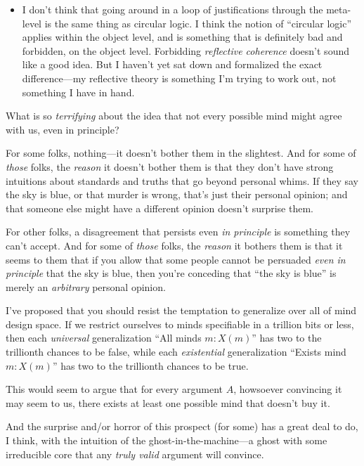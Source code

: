 \begin{itemize}
\item {
 I don't think that going around in a loop of
justifications through the meta-level is the same thing as circular
logic. I think the notion of ``circular
logic'' applies within the object level, and is
something that is definitely bad and forbidden, on the object level.
Forbidding \textit{reflective coherence} doesn't sound
like a good idea. But I haven't yet sat down and
formalized the exact difference---my reflective theory is something
I'm trying to work out, not something I have in hand.}
\end{itemize}

\myendsectiontext


{
 What is so \textit{terrifying} about the idea that not every
possible mind might agree with us, even in principle? }

{
 For some folks, nothing---it doesn't bother them
in the slightest. And for some of \textit{those} folks, the
\textit{reason} it doesn't bother them is that they
don't have strong intuitions about standards and truths
that go beyond personal whims. If they say the sky is blue, or that
murder is wrong, that's just their personal opinion;
and that someone else might have a different opinion
doesn't surprise them.}

{
 For other folks, a disagreement that persists even \textit{in
principle} is something they can't accept. And for some
of \textit{those} folks, the \textit{reason} it bothers them is that it
seems to them that if you allow that some people cannot be persuaded
\textit{even in principle} that the sky is blue, then
you're conceding that ``the sky is
blue'' is merely an \textit{arbitrary} personal
opinion.}

{
 I've proposed that you should resist the
temptation to generalize over all of mind design space. If we restrict
ourselves to minds specifiable in a trillion bits or less, then each
\textit{universal} generalization ``All minds $m:
X(m)$'' has two to the trillionth chances to be false,
while each \textit{existential} generalization
``Exists mind $m: X(m)$'' has two to
the trillionth chances to be true.}

{
 This would seem to argue that for every argument $A$, howsoever
convincing it may seem to us, there exists at least one possible mind
that doesn't buy it.}

{
 And the surprise and/or horror of this prospect (for some) has a
great deal to do, I think, with the intuition of the
ghost-in-the-machine---a ghost with some irreducible core that any
\textit{truly valid} argument will convince.}

